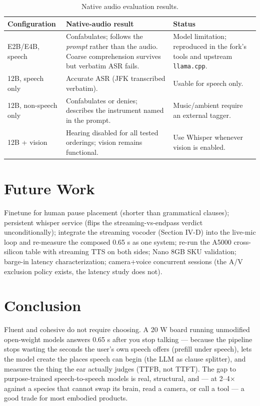 \documentclass[journal]{IEEEtran}
\begin{document}
    \begin{table}[H]
    \small
    \begin{tabularx}{\columnwidth}{lXX}
    \hline
    Configuration & Native-audio result & Status \\
    \hline
    E2B/E4B, speech &
    Confabulates; follows the \emph{prompt} rather than the audio. Coarse comprehension survives but verbatim ASR fails. &
    Model limitation; reproduced in the fork's tools and upstream \texttt{llama.cpp}. \\
    
    12B, speech only &
    Accurate ASR (JFK transcribed verbatim). &
    Usable for speech only. \\
    
    12B, non-speech only &
    Confabulates or denies; describes the instrument named in the prompt. &
    Music/ambient require an external tagger. \\
    
    12B + vision &
    Hearing disabled for all tested orderings; vision remains functional. &
    Use Whisper whenever vision is enabled. \\
    \end{tabularx}
    \caption{Native audio evaluation results.}
    \end{table}


\section{Future Work}

Finetune for human pause placement (shorter than grammatical clauses); persistent whisper service (flips the streaming-vs-endpass verdict unconditionally); integrate the streaming vocoder (Section IV-D) into the live-mic loop and re-measure the composed 0.65 s as one system; re-run the A5000 cross-silicon table with streaming TTS on both sides; Nano 8GB SKU validation; barge-in latency characterization; camera+voice concurrent sessions (the A/V exclusion policy exists, the latency study does not).

\section{Conclusion}

Fluent and cohesive do not require choosing. A 20 W board running unmodified open-weight models answers 0.65 s after you stop talking — because the pipeline stops wasting the seconds the user's own speech offers (prefill under speech), lets the model create the places speech can begin (the LLM as clause splitter), and measures the thing the ear actually judges (TTFB, not TTFT). The gap to purpose-trained speech-to-speech models is real, structural, and — at 2–4× against a species that cannot swap its brain, read a camera, or call a tool — a good trade for most embodied products.
\end{document}
